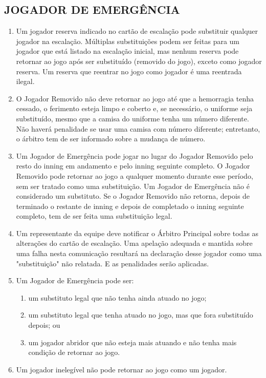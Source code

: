 \subsection{JOGADOR DE EMERGÊNCIA}
\begin{enumerate}[label=(\alph*)]
	\item Um jogador reserva indicado no cartão de escalação pode substituir qualquer jogador na escalação. Múltiplas substituições podem ser feitas para um jogador que está listado na escalação inicial, mas nenhum reserva pode retornar ao jogo após ser substituído (removido do jogo), exceto como jogador reserva. Um reserva que reentrar no jogo como jogador é uma reentrada ilegal.
	\item O Jogador Removido não deve retornar ao jogo até que a hemorragia tenha  cessado, o ferimento esteja limpo e coberto e, se necessário, o uniforme seja substituído, mesmo que a camisa do uniforme tenha um número diferente. Não haverá penalidade se usar uma camisa com número diferente; entretanto, o árbitro tem de ser informado sobre a mudança de número.
	\item Um Jogador de Emergência pode jogar no lugar do Jogador Removido pelo resto do \gls{inning} em andamento e pelo \gls{inning} seguinte completo. O Jogador Removido pode retornar ao jogo a qualquer momento durante esse período, sem ser tratado como uma substituição. Um Jogador de Emergência não é considerado um substituto. Se o Jogador Removido não retorna, depois de terminado o restante de \gls{inning} e depois de completado o \gls{inning} seguinte completo, tem de ser feita uma substituição legal.
 	\item Um representante da equipe deve notificar o Árbitro Principal sobre todas as alterações do cartão de escalação. Uma apelação adequada e mantida sobre uma falha nesta comunicação resultará na declaração desse jogador como uma "substituição" não relatada. E as penalidades serão aplicadas.
 	\item Um Jogador de Emergência pode ser:

	\begin{enumerate}[label=\roman*.]
		\item um substituto legal que não tenha ainda atuado no jogo;
		\item um substituto legal que tenha atuado no jogo, mas que fora substituído depois; ou
		\item um jogador abridor que não esteja mais atuando e não tenha mais condição de retornar ao jogo.
	\end{enumerate}
	\item  Um jogador inelegível não pode retornar ao jogo como um jogador.
\end{enumerate}

